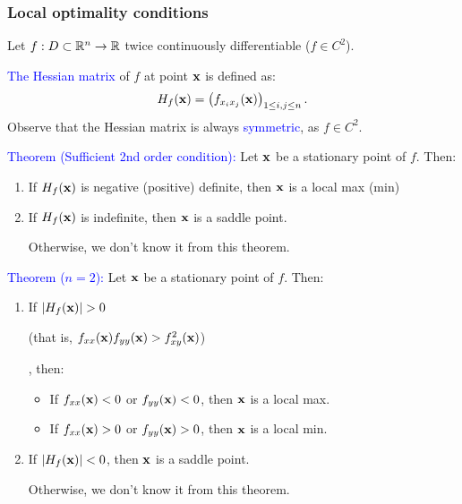 \documentclass[11pt,aspectratio=169]{beamer}
\begin{document}
\begin{frame}
\frametitle{Local optimality conditions}
\begin{small}
Let $f: D \subset\mathbb R^n \rightarrow \mathbb R$ twice continuously differentiable ($f \in C^2$).

\textcolor{blue}{The Hessian matrix} of $f$ at point ${\bf x}$ is defined as:
$$
H_f({\bf x})=\left(f_{x_i x_j}({\bf x})\right)_{1 \leq i,j \leq n}.
$$
Observe that the Hessian matrix is always \textcolor{blue}{symmetric}, as $f \in C^2$.



\textcolor{blue}{Theorem (Sufficient 2nd order condition):} Let ${\bf x}$ be a stationary point of $f$. Then:
\begin{enumerate}
\item If $H_f({\bf x})$ is negative (positive) definite, then ${\bf x}$ is a local
max (min) 
\item If $H_f({\bf x})$ is indefinite, then ${\bf x}$ is a saddle point.

\begin{tiny}Otherwise, we don't know it from this theorem. \end{tiny}
\end{enumerate}

 \textcolor{blue}{Theorem ($n=2$):} Let ${\bf x}$ be a stationary point of $f$. Then:
\begin{enumerate}
\item If $\vert H_f({\bf x})\vert >0$ \begin{tiny}(that is, $f_{xx}({\bf x})f_{yy}({\bf x})>f_{xy}^2({\bf x})$) \end{tiny}, then:
\begin{itemize}
\item If $f_{xx}({\bf x})<0$ or $f_{yy}({\bf x})<0$, then ${\bf x}$ is a local max.
\item If $f_{xx}({\bf x})>0$ or $f_{yy}({\bf x})>0$, then ${\bf x}$ is a local min.
\end{itemize}
\item If $\vert H_f({\bf x})\vert <0$, then ${\bf x}$ is a saddle point.

\begin{tiny}Otherwise, we don't know it from this theorem. \end{tiny}
\end{enumerate}



\end{small}
\end{frame}
\end{document}
